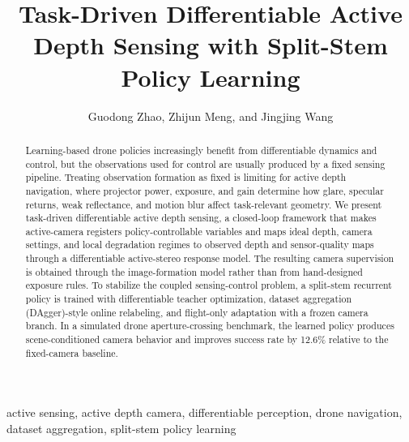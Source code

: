 \documentclass[letterpaper,journal]{IEEEtran}
\begin{document}
\title{Task-Driven Differentiable Active Depth Sensing with Split-Stem Policy Learning}
\author{Guodong Zhao, Zhijun Meng, and Jingjing Wang}
\maketitle

\begin{abstract}
Learning-based drone policies increasingly benefit from differentiable dynamics
and control, but the observations used for control are usually produced by a
fixed sensing pipeline. Treating observation formation as fixed is limiting for
active depth navigation, where projector power, exposure, and
gain determine how glare, specular returns, weak reflectance, and motion blur
affect task-relevant geometry. We present task-driven differentiable active
depth sensing, a closed-loop framework that makes active-camera registers
policy-controllable variables and maps ideal depth, camera settings, and local
degradation regimes to observed depth and sensor-quality maps through a
differentiable active-stereo response model. The resulting camera supervision
is obtained through the image-formation model rather than from hand-designed
exposure rules. To stabilize the coupled sensing-control problem, a split-stem
recurrent policy is trained with differentiable teacher optimization, dataset
aggregation (DAgger)-style online relabeling, and flight-only adaptation with a
frozen camera branch. In a simulated drone aperture-crossing benchmark, the
learned policy produces scene-conditioned camera behavior and improves success
rate by 12.6\% relative to the fixed-camera baseline.
\end{abstract}

\begin{IEEEkeywords}
active sensing, active depth camera, differentiable perception, drone
navigation, dataset aggregation, split-stem policy learning
\end{IEEEkeywords}
\end{document}
